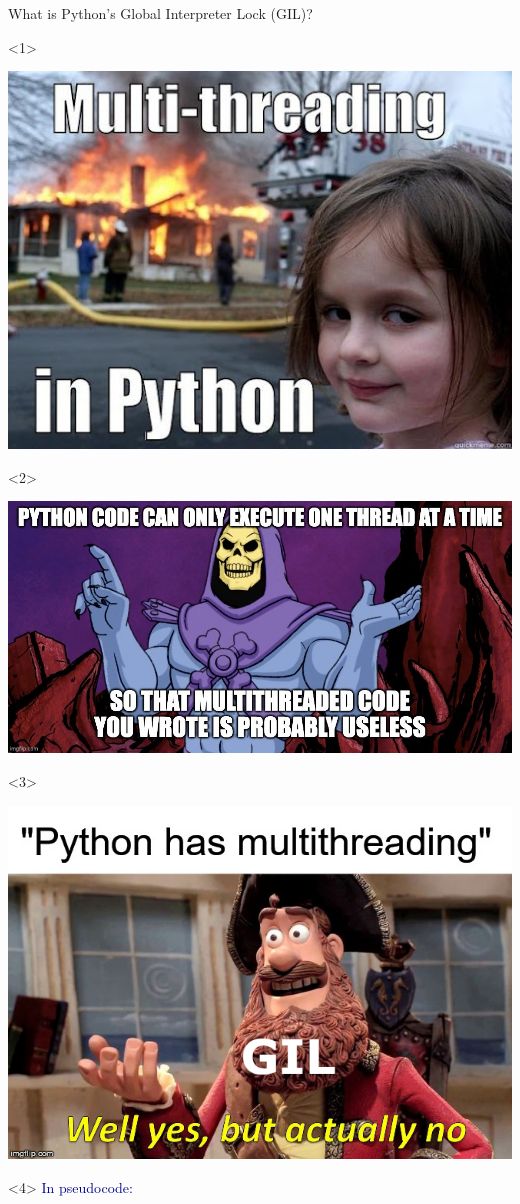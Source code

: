 \documentclass[aspectratio=169]{beamer}
\begin{document}
\begin{frame}[fragile]{What is Python's Global Interpreter Lock (GIL)?}
\Large
\vspace{0.5 cm}
\begin{onlyenv}<1>
\begin{center}
\includegraphics[height=5 cm]{img/python-gil-meme-1.jpg}
\end{center}
\end{onlyenv}\begin{onlyenv}<2>
\begin{center}
\includegraphics[height=5 cm]{img/python-gil-meme-2.jpg}
\end{center}
\end{onlyenv}\begin{onlyenv}<3>
\begin{center}
\includegraphics[height=5 cm]{img/python-gil-meme-3.png}
\end{center}
\end{onlyenv}\begin{onlyenv}<4>
\hspace{-0.25 cm}\textcolor{darkblue}{In pseudocode:}


\end{onlyenv}
\end{frame}
\end{document}
